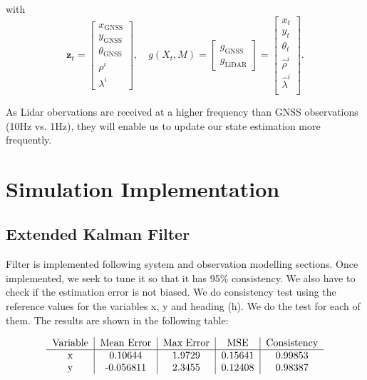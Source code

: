 \documentclass[conference]{IEEEtran}
\begin{document}
with
\[
\mathbf{z}_t =
\begin{bmatrix}
x_\text{GNSS} \\
y_\text{GNSS} \\
\theta_\text{GNSS} \\
\rho^{i} \\
\lambda^{i}
\end{bmatrix}, \quad
g(X_t, M) =
\begin{bmatrix}
g_\text{GNSS} \\
g_\text{LiDAR}
\end{bmatrix} = 
\begin{bmatrix}
x_t \\
y_t \\
\theta_t \\
\hat{\rho}^{i} \\
\hat{\lambda}^{i} \\
\end{bmatrix}.
\]

\vspace{3mm}

\noindent As Lidar obervations are received at a higher frequency than GNSS observations (10Hz vs. 1Hz), they will enable us to update our state estimation more frequently.

\section{Simulation Implementation}

\subsection{Extended Kalman Filter}

Filter is implemented following system and observation modelling sections. Once implemented, we seek to tune it so that it has 95\% consistency. We also have to check if the estimation error is not biased. We do consistency test using the reference values for the variables x, y and heading (h). We do the test for each of them. The results are shown in the following table:

\begin{align*}
\begin{tabular}{c|c|c|c|c} 
  Variable & Mean Error & Max Error & MSE & Consistency \\ \hline 
  x & 0.10644 & 1.9729 & 0.15641 & 0.99853 \\
  y   & -0.056811 & 2.3455 &  0.12408 & 0.98387\\
\end{tabular}
\end{align*}
\end{document}

